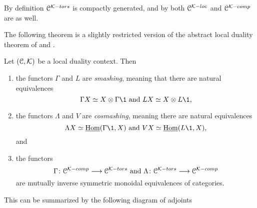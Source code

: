 \begin{remark}
    \label{ch0:rm:tors-loc-comp-compactly-generated}
    By definition $\EuScript{C}^{\mathcal{K}-tors}$ is compactly generated, and by \cite[2.17]{barthel-heard-valenzuela_2018} both $\EuScript{C}^{\mathcal{K}-loc}$ and $\EuScript{C}^{\mathcal{K}-comp}$ are as well. 
\end{remark}

The following theorem is a slightly restricted version of the abstract local duality theorem of \cite[3.3.5]{hovey-palmiery-strickland_97} and \cite[2.21]{barthel-heard-valenzuela_2018}.  

\begin{theorem}
    \label{ch0:thm:local-duality}
    Let $(\EuScript{C}, \mathcal{K})$ be a local duality context. Then
    \begin{enumerate}
        \item the functors $\Gamma$ and $L$ are \emph{smashing}, meaning that there are natural equivalences 
        \[\Gamma X\simeq X\otimes \Gamma \1 \text{ and } LX\simeq X\otimes L\1,\]
        \item the functors $\Lambda$ and $V$ are \emph{cosmashing}, meaning there are natural equivalences 
        \[\Lambda X\simeq \iHom(\Gamma \1,X) \text{ and } VX\simeq \iHom(L\1, X),\]
        and
        \item the functors 
        \[\Gamma\colon \EuScript{C}^{\mathcal{K}-comp}\longrightarrow \EuScript{C}^{\mathcal{K}-tors} \text{ and } \Lambda\colon \EuScript{C}^{\mathcal{K}-tors}\longrightarrow \EuScript{C}^{\mathcal{K}-comp}\]
        are mutually inverse symmetric monoidal equivalences of categories.
    \end{enumerate}
    This can be summarized by the following diagram of adjoints
    \begin{center}
    \end{center}
\end{theorem}


